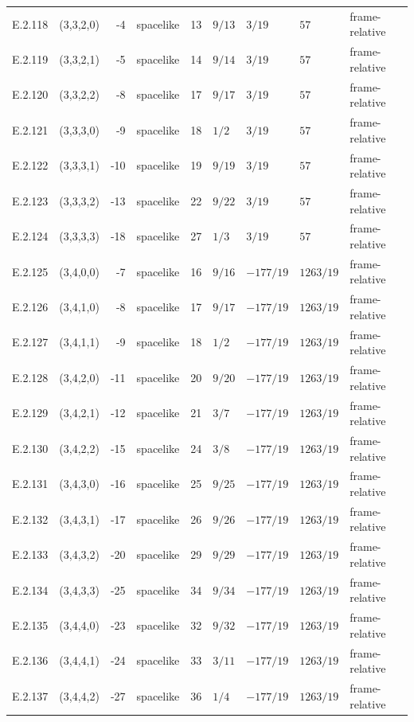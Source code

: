 {\begin{longtable}{@{}llrlrllll@{}}
E.2.118 & (3,3,2,0) & -4 & spacelike & 13 & $9/13$ & $3/19$ & $57$ & frame-relative \\
E.2.119 & (3,3,2,1) & -5 & spacelike & 14 & $9/14$ & $3/19$ & $57$ & frame-relative \\
E.2.120 & (3,3,2,2) & -8 & spacelike & 17 & $9/17$ & $3/19$ & $57$ & frame-relative \\
E.2.121 & (3,3,3,0) & -9 & spacelike & 18 & $1/2$ & $3/19$ & $57$ & frame-relative \\
E.2.122 & (3,3,3,1) & -10 & spacelike & 19 & $9/19$ & $3/19$ & $57$ & frame-relative \\
E.2.123 & (3,3,3,2) & -13 & spacelike & 22 & $9/22$ & $3/19$ & $57$ & frame-relative \\
E.2.124 & (3,3,3,3) & -18 & spacelike & 27 & $1/3$ & $3/19$ & $57$ & frame-relative \\
E.2.125 & (3,4,0,0) & -7 & spacelike & 16 & $9/16$ & $-177/19$ & $1263/19$ & frame-relative \\
E.2.126 & (3,4,1,0) & -8 & spacelike & 17 & $9/17$ & $-177/19$ & $1263/19$ & frame-relative \\
E.2.127 & (3,4,1,1) & -9 & spacelike & 18 & $1/2$ & $-177/19$ & $1263/19$ & frame-relative \\
E.2.128 & (3,4,2,0) & -11 & spacelike & 20 & $9/20$ & $-177/19$ & $1263/19$ & frame-relative \\
E.2.129 & (3,4,2,1) & -12 & spacelike & 21 & $3/7$ & $-177/19$ & $1263/19$ & frame-relative \\
E.2.130 & (3,4,2,2) & -15 & spacelike & 24 & $3/8$ & $-177/19$ & $1263/19$ & frame-relative \\
E.2.131 & (3,4,3,0) & -16 & spacelike & 25 & $9/25$ & $-177/19$ & $1263/19$ & frame-relative \\
E.2.132 & (3,4,3,1) & -17 & spacelike & 26 & $9/26$ & $-177/19$ & $1263/19$ & frame-relative \\
E.2.133 & (3,4,3,2) & -20 & spacelike & 29 & $9/29$ & $-177/19$ & $1263/19$ & frame-relative \\
E.2.134 & (3,4,3,3) & -25 & spacelike & 34 & $9/34$ & $-177/19$ & $1263/19$ & frame-relative \\
E.2.135 & (3,4,4,0) & -23 & spacelike & 32 & $9/32$ & $-177/19$ & $1263/19$ & frame-relative \\
E.2.136 & (3,4,4,1) & -24 & spacelike & 33 & $3/11$ & $-177/19$ & $1263/19$ & frame-relative \\
E.2.137 & (3,4,4,2) & -27 & spacelike & 36 & $1/4$ & $-177/19$ & $1263/19$ & frame-relative \\

\end{longtable}}
